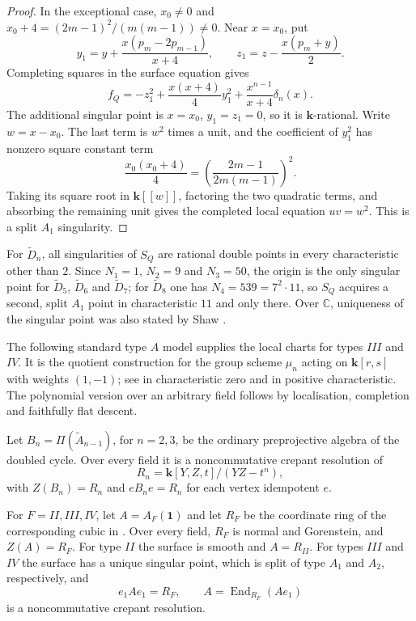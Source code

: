 \documentclass[a4paper]{amsart}
\newcommand{\kk}{\mathbf{k}}
\newcommand{\C}{\mathbb{C}}
\numberwithin{equation}{section}
\begin{document}
\begin{proof}
In the exceptional case, $x_0\ne0$ and
$x_0+4=(2m-1)^2/(m(m-1))\ne0$. Near $x=x_0$, put
\[
 y_1=y+\frac{x(p_m-2p_{m-1})}{x+4},\qquad
 z_1=z-\frac{x(p_m+y)}2.
\]
Completing squares in the surface equation gives
\[
 f_Q=-z_1^2+\frac{x(x+4)}4y_1^2
       +\frac{x^{n-1}}{x+4}\delta_n(x).
\]
The additional singular point is $x=x_0$, $y_1=z_1=0$, so it is
$\kk$-rational. Write $w=x-x_0$. The last term is $w^2$ times a
unit, and the coefficient of $y_1^2$ has nonzero square constant term
\[
 \frac{x_0(x_0+4)}4
 =\left(\frac{2m-1}{2m(m-1)}\right)^2.
\]
Taking its square root in $\kk[[w]]$, factoring the two quadratic
terms, and absorbing the remaining unit gives the completed local
equation $uv=w^2$. This is a split $A_1$ singularity.
\end{proof}

\begin{remark}\label{rem:shaw-D-singular-points}
For $\widetilde D_n$, all singularities of $S_Q$ are rational double
points in every characteristic other than $2$. Since
$N_1=1$, $N_2=9$ and $N_3=50$, the origin is the only singular point
for $\widetilde D_5$, $\widetilde D_6$ and $\widetilde D_7$; for
$\widetilde D_8$ one has $N_4=539=7^2\cdot11$, so $S_Q$ acquires a
second, split $A_1$ point in characteristic $11$ and only there. Over
$\C$, uniqueness of the singular point was also stated by Shaw
\cite[Section~4.1]{ShawThesis}.
\end{remark}

The following standard type $A$ model supplies the local charts
for types $III$ and $IV$. It is the quotient construction for
the group scheme $\mu_n$ acting on $\kk[r,s]$ with weights $(1,-1)$;
see \cite[Example~1.1]{VdBNCCR} in characteristic zero and
\cite[Theorems~1.5 and~1.7]{LiedtkeYasuda} in positive characteristic.
The polynomial version over an arbitrary field follows by
localisation, completion and faithfully flat descent.

\begin{lemma}\label{lem:cyclic-additive-order}
Let $B_n=\Pi(\widetilde A_{n-1})$, for $n=2,3$, be the ordinary
preprojective algebra of the doubled cycle. Over every field it is a
noncommutative crepant resolution of
\[
 R_n=\kk[Y,Z,t]/(YZ-t^n),
\]
with $Z(B_n)=R_n$ and $eB_ne=R_n$ for each vertex idempotent $e$.
\end{lemma}

\begin{proposition}\label{prop:nontransverse-centres}
For $F=II,III,IV$, let $A=A_F(\boldsymbol1)$ and let $R_F$ be the
coordinate ring of the corresponding cubic in
. Over every field, $R_F$ is normal and
Gorenstein, and $Z(A)=R_F$. For type $II$ the surface is smooth and $A=R_{II}$.
For types $III$ and $IV$ the surface has a unique singular point,
which is split of type $A_1$ and $A_2$, respectively, and
\[
 e_1Ae_1=R_F,\qquad A=\operatorname{End}_{R_F}(Ae_1)
\]
is a noncommutative crepant resolution.
\end{proposition}
\end{document}
